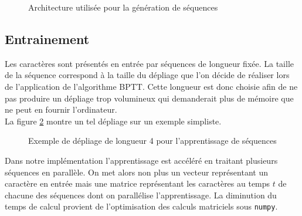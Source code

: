 \begin{figure}[h!]
\centering
{}
\caption{Architecture utilisée pour la génération de séquences}
\label{LSTM_augmented}
\end{figure}


\subsection{Entrainement}

Les caractères sont présentés en entrée par séquences de longueur fixée. La taille de la séquence correspond à la taille du dépliage que l'on décide de réaliser lors de l'application de l'algorithme BPTT. Cette longueur est donc choisie afin de ne pas produire un dépliage trop volumineux qui demanderait plus de mémoire que ne peut en fournir l'ordinateur.
\\ La figure \ref{LSTM_unfold} montre un tel dépliage sur un exemple simpliste.

\begin{figure}[H]
\centering
\resizebox{1\linewidth}{!}{}
\caption{Exemple de dépliage de longueur 4 pour l'apprentissage de séquences}
\label{LSTM_unfold}
\end{figure}

Dans notre implémentation l'apprentissage est accéléré en traitant plusieurs séquences en parallèle. On met alors non plus un vecteur représentant un caractère en entrée mais une matrice représentant les caractères au temps $t$ de chacune des séquences dont on parallélise l'apprentissage. La diminution du temps de calcul provient de l'optimisation des calculs matriciels sous \texttt{numpy}.

